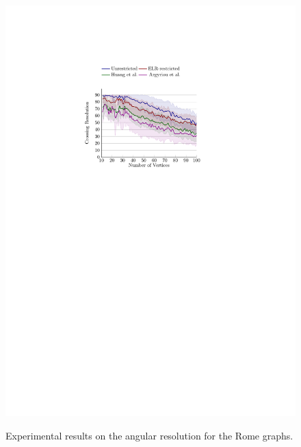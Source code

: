 \documentclass{comjnl}
\begin{document}
\begin{figure}[t]
{	\includegraphics[scale=0.99,page=8]{figures/rome_colored}}
	\caption{Experimental results on the angular resolution for the Rome graphs.}
	\label{fig:an-res}
\end{figure}
\end{document}
